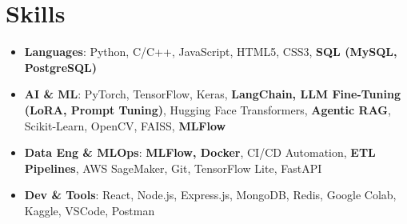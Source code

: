 \documentclass[a4paper, 11pt]{article}
\newcommand{\resumeItem}[2]{
  \item\small{
    \textbf{#1}{: #2 \vspace{-4pt}}
  }
}
\newcommand{\resumeSubItem}[2]{\resumeItem{#1}{#2}\vspace{-5pt}}
\newcommand{\resumeSubHeadingListStart}{\begin{itemize}[leftmargin=*,
      label={}]}
\newcommand{\resumeSubHeadingListEnd}{\end{itemize}}
\begin{document}
\section{Skills}
\vspace{3pt}
\resumeSubHeadingListStart
\resumeSubItem{Languages}{Python, C/C++, JavaScript, HTML5, CSS3, \textbf{SQL (MySQL, PostgreSQL)}}
\vspace{4pt}
\resumeSubItem{AI \& ML}{PyTorch, TensorFlow, Keras, \textbf{LangChain, LLM Fine-Tuning (LoRA, Prompt Tuning)}, Hugging Face Transformers, \textbf{Agentic RAG}, Scikit-Learn, OpenCV, FAISS, \textbf{MLFlow}}
\vspace{4pt}
\resumeSubItem{Data Eng \& MLOps}{\textbf{MLFlow, Docker}, CI/CD Automation, \textbf{ETL Pipelines}, AWS SageMaker, Git, TensorFlow Lite, FastAPI}
\vspace{4pt}
\resumeSubItem{Dev \& Tools}{React, Node.js, Express.js, MongoDB, Redis, Google Colab, Kaggle, VSCode, Postman}
\resumeSubHeadingListEnd




\end{document}
